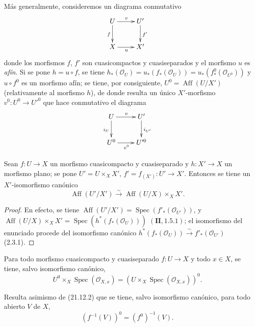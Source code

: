 Más generalmente, consideremos un diagrama conmutativo
\[
  \xymatrix{
    U \ar[r]^v \ar[d]_f & U' \ar[d]^{f'} \\
    X \ar[r]_u & X'
  }
\]
donde los morfismos $f$, $f'$ son cuasicompactos y cuasiseparados y el morfismo $u$ es
\emph{afín}. Si se pone $h=u\circ f$, se tiene
$h_*(\mathcal O_U)=u_*(f_*(\mathcal O_U))=u_*(f^0_*(\mathcal O_{U^0}))$ y
$u\circ f^0$ es un morfismo afín; se tiene, por consiguiente,
$U^0=\operatorname{Aff}(U/X')$ (relativamente al morfismo $h$), de donde resulta un único
$X'$-morfismo $v^0:U^0\to U'^0$ que hace conmutativo el diagrama
\[
  \xymatrix{
    U \ar[r]^v \ar[d]_{i_U} & U' \ar[d]^{i_{U'}} \\
    U^0 \ar[r]_{v^0} & U'^0
  }
\]

\begin{proposition}[21.12.2]
\label{IV.21.12.2}
Sean $f:U\to X$ un morfismo cuasicompacto y cuasiseparado y
$h:X'\to X$ un morfismo \textup{plano}; se pone $U'=U\times_X X'$,
$f'=f_{(X')}:U'\to X'$. Entonces se tiene un $X'$-isomorfismo canónico
\[
\label{IV.21.12.2.1}
  \operatorname{Aff}(U'/X')\xrightarrow{\sim}
  \operatorname{Aff}(U/X)\times_X X'.
  \tag{21.12.2.1}
\]
\end{proposition}

\begin{proof}
En efecto, se tiene
$\operatorname{Aff}(U'/X')=\operatorname{Spec}(f'_*(\mathcal O_{U'}))$, y
$\operatorname{Aff}(U/X)\times_X X'=\operatorname{Spec}(h^*(f_*(\mathcal O_U)))$
$(\mathbf{II}, 1.5.1)$; el isomorfismo del enunciado procede del isomorfismo canónico
$h^*(f_*(\mathcal O_U))\xrightarrow{\sim}f'_*(\mathcal O_{U'})$ (2.3.1).
\end{proof}

\begin{corollary}[21.12.3]
\label{IV.21.12.3}
Para todo morfismo cuasicompacto y cuasiseparado $f:U\to X$ y todo $x\in X$, se tiene,
salvo isomorfismo canónico,
\[
  U^0\times_X\operatorname{Spec}(\mathcal O_{X,x})
  =(U\times_X\operatorname{Spec}(\mathcal O_{X,x}))^0.
\]
\end{corollary}

Resulta asimismo de (21.12.2) que se tiene, salvo isomorfismo canónico, para todo
abierto $V$ de $X$,
\[
\label{IV.21.12.4}
  (f^{-1}(V))^0=(f^0)^{-1}(V).
  \tag{21.12.4}
\]

